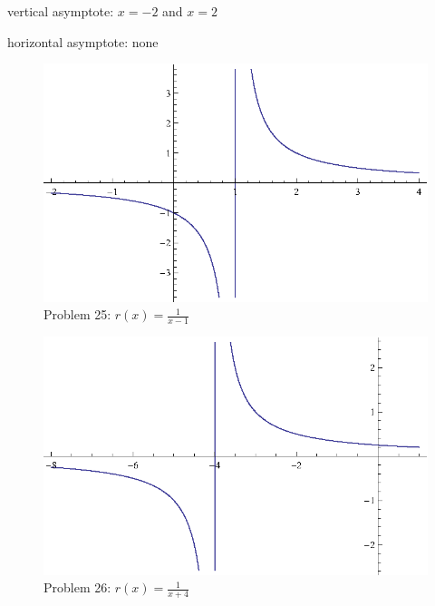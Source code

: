 \documentclass{exam}
\begin{document}
\begin{description}
      \begin{itemize*}
        \item vertical asymptote: $x = -2$ and $x = 2$
        \item horizontal asymptote: none
      \end{itemize*}

    \item[25] 
      \begin{figure}[H]
        \centering
        \includegraphics{problem25.eps}
        \caption*{Problem 25: $r(x) = \frac{1}{x - 1}$}
      \end{figure}

    \item[26] 
      \begin{figure}[H]
        \centering
        \includegraphics{problem26.eps}
        \caption*{Problem 26: $r(x) = \frac{1}{x + 4}$}
      \end{figure}


\end{description}
\end{document}
